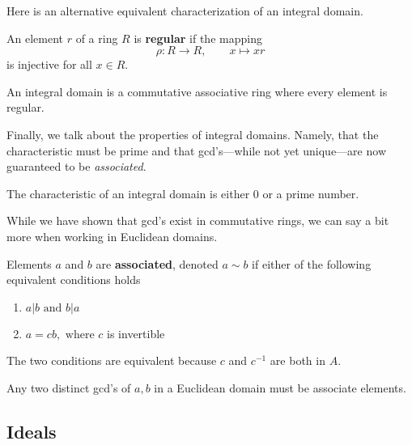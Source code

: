   Here is an alternative equivalent characterization of an integral domain. 

  \begin{definition}
     An element $r$ of a ring $R$ is \textbf{regular} if the mapping 
     \begin{equation}
       \rho: R \longrightarrow R, \qquad x \mapsto x r
     \end{equation}
    is injective for all $x \in R$. 
  \end{definition}

  \begin{theorem}
    An integral domain is a commutative associative ring where every element is regular. 
  \end{theorem} 

  Finally, we talk about the properties of integral domains. Namely, that the characteristic must be prime and that gcd's---while not yet unique---are now guaranteed to be \textit{associated}. 

  \begin{theorem}
    The characteristic of an integral domain is either $0$ or a prime number. 
  \end{theorem}

  While we have shown that gcd's exist in commutative rings, we can say a bit more when working in Euclidean domains. 

  \begin{definition}
    Elements $a$ and $b$ are \textbf{associated}, denoted $a \sim b$ if either of the following equivalent conditions holds
    \begin{enumerate}
        \item $a | b \text{ and } b | a$
        \item $a = c b, \text{ where } c$ is invertible
    \end{enumerate}
    The two conditions are equivalent because $c$ and $c^{-1}$ are both in $A$. 
  \end{definition} 

  \begin{theorem}
    Any two distinct gcd's of $a, b$ in a Euclidean domain must be associate elements. 
  \end{theorem}

\subsection{Ideals}

